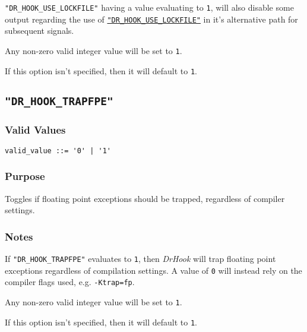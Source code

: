 \texttt{"DR\_HOOK\_USE\_LOCKFILE"} having a value evaluating to \texttt{1}, will also disable some output regarding the use of \hyperref[section:flags:DR_HOOK_USE_LOCKFILE]{\texttt{"DR\_HOOK\_USE\_LOCKFILE"}} in it's alternative path for subsequent signals.

Any non-zero valid integer value will be set to \verb|1|.

If this option isn't specified, then it will default to \verb|1|.



\subsection{\texttt{"DR\_HOOK\_TRAPFPE"}}
\label{section:flags:DR_HOOK_TRAPFPE}
\vspace{-2ex}
\subsubsection{Valid Values}
\vspace{-2ex}
\verb+valid_value ::= '0' | '1'+ 

\vspace{-2ex}
\subsubsection{Purpose}
\vspace{-2ex}
Toggles if floating point exceptions should be trapped, regardless of compiler settings.

\vspace{-2ex}
\subsubsection{Notes}
\vspace{-2ex}
If \texttt{"DR\_HOOK\_TRAPFPE"} evaluates to \texttt{1}, then \textit{DrHook} will trap floating point exceptions regardless of compilation settings. A value of \texttt{0} will instead rely on the compiler flags used, e.g. \texttt{-Ktrap=fp}.

Any non-zero valid integer value will be set to \verb|1|.

If this option isn't specified, then it will default to \verb|1|.



